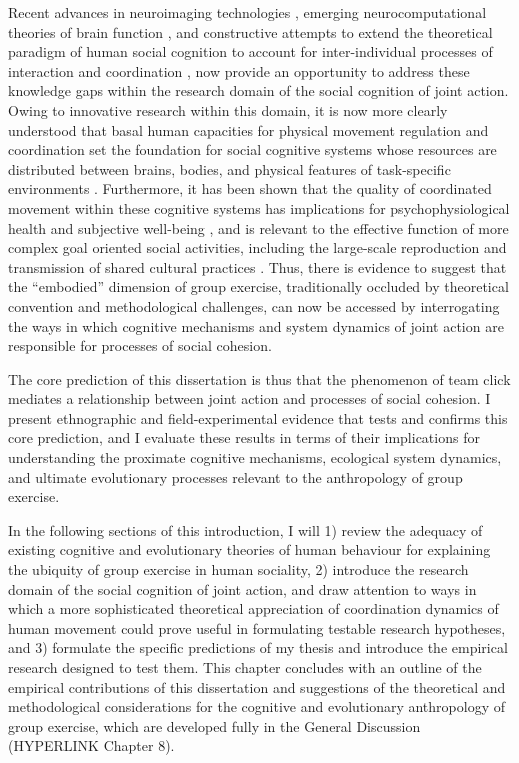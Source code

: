 Recent advances in neuroimaging technologies \citep{Frith2007}, emerging neurocomputational theories of brain function \citep{Friston2010,Frith2010,Clark2013}, and constructive attempts to extend the theoretical paradigm of human social cognition to account for inter-individual processes of interaction and coordination \citep{Sebanz2006,Dale2014}, now provide an opportunity to address these knowledge gaps within the research domain of the social cognition of joint action.  Owing to innovative research within this domain, it is now more clearly understood that basal human capacities for physical movement regulation and coordination set the foundation for social cognitive systems whose resources are distributed between brains, bodies, and physical features of task-specific environments \citep{Hutchins2000,Kirsh2006,Semin2008,Semin2012,Coey2012}.
Furthermore, it has been shown that the quality of coordinated movement within these cognitive systems has implications for psychophysiological health and subjective well-being \citep{Wheatley2012}, and is relevant to the effective function of more complex goal oriented social activities, including the large-scale reproduction and transmission of shared cultural practices \citep{Dunbar2012,Roepstorff2010,Claidiere2014,Launay2016}. Thus, there is evidence to suggest that the ``embodied'' dimension of group exercise, traditionally occluded by theoretical convention and methodological challenges, can now be accessed by  interrogating the ways in which cognitive mechanisms and system dynamics of joint action are responsible for processes of social cohesion.

The core prediction of this dissertation is thus that the phenomenon of team click mediates a relationship between joint action and processes of social cohesion. I present ethnographic and field-experimental evidence that tests and confirms this core prediction, and I evaluate these results in terms of their implications for understanding the proximate cognitive mechanisms, ecological system dynamics, and ultimate evolutionary processes relevant to the anthropology of group exercise.

In the following sections of this introduction, I will 1) review the adequacy of existing cognitive and evolutionary theories of human behaviour for explaining the ubiquity of group exercise in human sociality, 2) introduce the research domain of the social cognition of joint action, and draw attention to ways in which a more sophisticated theoretical appreciation of coordination dynamics of human movement could prove useful in formulating testable research hypotheses, and 3) formulate the specific predictions of my thesis and introduce the empirical research designed to test them.  This chapter concludes with an outline of the empirical contributions of this dissertation and suggestions of the theoretical and methodological considerations for the cognitive and evolutionary anthropology of group exercise, which are developed fully in the General Discussion (HYPERLINK Chapter 8).

